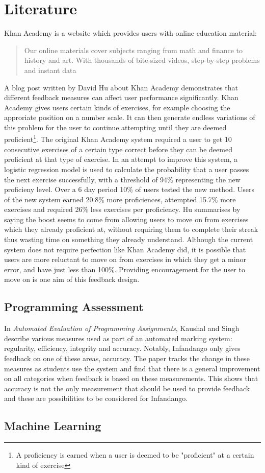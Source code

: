 \section{Literature}
Khan Academy\cite{khan_site} is a website which provides users with online education material:
\begin{quote}
Our online materials cover subjects ranging from math and finance to history and art.  With thousands of bite-sized videos, step-by-step problems and instant data\cite{ka_faq}
\end{quote}


A blog post\cite{khan_blog} written by David Hu about Khan Academy demonstrates that different feedback measures can affect user performance significantly. Khan Academy gives users certain kinds of exercises, for example choosing the approriate position on a number scale. It can then generate endless variations of this problem for the user to continue attempting until they are deemed proficient\footnote{
A proficiency is earned when a user is deemed to be "proficient" at a certain kind of exercise
}. The original Khan Academy system required a user to get 10 consecutive exercises of a certain type correct before they can be deemed proficient at that type of exercise. In an attempt to improve this system, a logistic regression model is used to calculate the probability that a user passes the next exercise successfully, with a threshold of 94\% representing the new proficieny level. Over a 6 day period 10\% of users tested the new method. Users of the new system earned 20.8\% more proficiences, attempted 15.7\% more exercises and required 26\% less exercises per proficiency. Hu summarises by saying the boost seems to come from allowing users to move on from exercises which they already proficient at, without requiring them to complete their streak thus wasting time on something they already understand.
Although the current system does not require perfection like Khan Academy did, it is possible that users are more reluctant to move on from exercises in which they get a minor error, and have just less than 100\%. Providing encouragement for the user to move on is one aim of this feedback design.
\subsection{Programming Assessment}
In {\it Automated Evaluation of Programming Assignments}\cite{automate_evaluation}, Kaushal and Singh describe various measures used as part of an automated marking system: regularity, efficiency, integrity and accuracy. Notably, Infandango only gives feedback on one of these areas, accuracy. The paper tracks the change in these measures as students use the system and find that there is a general improvement on all categories when feedback is based on these measurements. This shows that accuracy is not the only measurement that should be used to provide feedback and these are possibilities to be considered for Infandango.
\subsection{Machine Learning}
